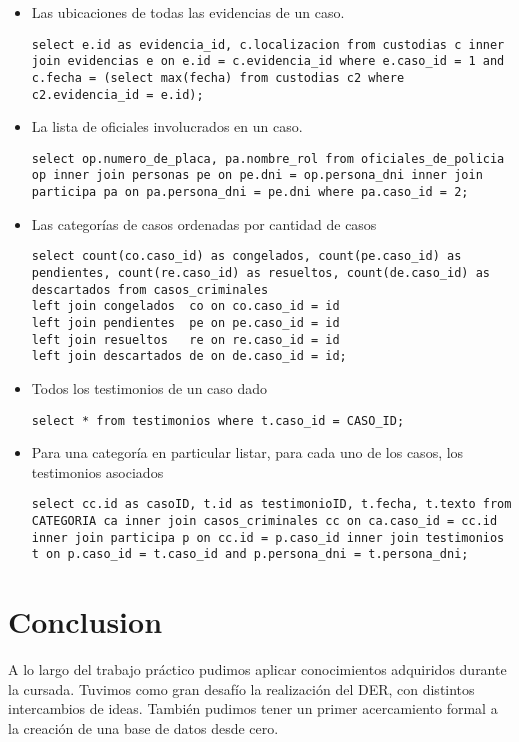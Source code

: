 \documentclass[10pt,a4paper]{article}
\begin{document}
\begin{itemize}
\begin{verbatim}
\end{verbatim}
\item Las ubicaciones de todas las evidencias de un caso.
\begin{verbatim}
select e.id as evidencia_id, c.localizacion from custodias c inner join evidencias e on e.id = c.evidencia_id where e.caso_id = 1 and c.fecha = (select max(fecha) from custodias c2 where c2.evidencia_id = e.id);
\end{verbatim}
\item La lista de oficiales involucrados en un caso.
\begin{verbatim}
select op.numero_de_placa, pa.nombre_rol from oficiales_de_policia op inner join personas pe on pe.dni = op.persona_dni inner join participa pa on pa.persona_dni = pe.dni where pa.caso_id = 2;
\end{verbatim}
\item Las categorías de casos ordenadas por cantidad de casos
\begin{verbatim}
select count(co.caso_id) as congelados, count(pe.caso_id) as pendientes, count(re.caso_id) as resueltos, count(de.caso_id) as descartados from casos_criminales 
left join congelados  co on co.caso_id = id 
left join pendientes  pe on pe.caso_id = id 
left join resueltos   re on re.caso_id = id 
left join descartados de on de.caso_id = id;
\end{verbatim}
\item Todos los testimonios de un caso dado
\begin{verbatim}
select * from testimonios where t.caso_id = CASO_ID;
\end{verbatim}
\item Para una categoría en particular listar, para cada uno de los casos, los testimonios
asociados
\begin{verbatim}
select cc.id as casoID, t.id as testimonioID, t.fecha, t.texto from CATEGORIA ca inner join casos_criminales cc on ca.caso_id = cc.id inner join participa p on cc.id = p.caso_id inner join testimonios t on p.caso_id = t.caso_id and p.persona_dni = t.persona_dni;
\end{verbatim}
\end{itemize}

\section{Conclusion}
A lo largo del trabajo práctico pudimos aplicar conocimientos adquiridos durante la cursada. Tuvimos como gran desafío la realización del DER, con distintos intercambios de ideas. También pudimos tener un primer acercamiento formal a la creación de una base de datos desde cero. 
\end{document}
